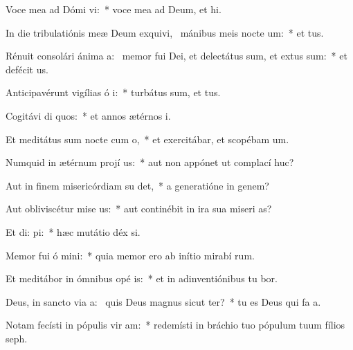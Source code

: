 \item Voce mea ad Dómi vi:~* voce mea ad Deum, et  hi.
\item In die tribulatiónis meæ Deum exquivi,~\pscross{} mánibus meis nocte  um:~* et   tus.
\item Rénuit consolári ánima a:~\pscross{} memor fui Dei, et delectátus sum, et extus sum:~* et defécit  us.
\item Anticipavérunt vigílias ó i:~* turbátus sum, et   tus.
\item Cogitávi di quos:~* et annos ætérnos   i.
\item Et meditátus sum nocte cum  o,~* et exercitábar, et scopébam  um.
\item Numquid in ætérnum projí us:~* aut non appónet ut complací  huc?
\item Aut in finem misericórdiam su det,~* a generatióne in genem?
\item Aut obliviscétur mise us:~* aut continébit in ira sua miseri as?
\item Et di:  pi:~* hæc mutátio déx si.
\item Memor fui ó mini:~* quia memor ero ab inítio mirabí rum.
\item Et meditábor in ómnibus opé is:~* et in adinventiónibus tu bor.
\item Deus, in sancto via a:~\pscross{} quis Deus magnus sicut  ter?~* tu es Deus qui fa a.
\item Notam fecísti in pópulis vir am:~* redemísti in bráchio tuo pópulum tuum fílios   seph.
